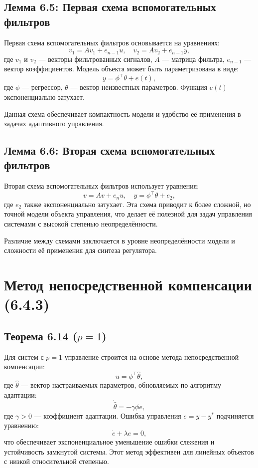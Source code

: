 \documentclass[a4paper,14pt]{extarticle} %
\begin{document}
\subsection{Лемма 6.5: Первая схема вспомогательных фильтров}
Первая схема вспомогательных фильтров основывается на уравнениях:
\[
v_1 = A v_1 + e_{n-1} u, \quad v_2 = A v_2 + e_{n-1} y,
\]
где \( v_1 \) и \( v_2 \) — векторы фильтрованных сигналов, \( A \) — матрица фильтра, \( e_{n-1} \) — вектор коэффициентов. Модель объекта может быть параметризована в виде:
\[
y = \phi^\top \theta + e(t),
\]
где \( \phi \) — регрессор, \( \theta \) — вектор неизвестных параметров. Функция \( e(t) \) экспоненциально затухает.

Данная схема обеспечивает компактность модели и удобство её применения в задачах адаптивного управления.

\subsection{Лемма 6.6: Вторая схема вспомогательных фильтров}
Вторая схема вспомогательных фильтров использует уравнения:
\[
v = A v + e_n u, \quad y = \phi^\top \theta + e_2,
\]
где \( e_2 \) также экспоненциально затухает. Эта схема приводит к более сложной, но точной модели объекта управления, что делает её полезной для задач управления системами с высокой степенью неопределённости.

Различие между схемами заключается в уровне неопределённости модели и сложности её применения для синтеза регулятора.

\section{Метод непосредственной компенсации (6.4.3)}

\subsection{Теорема 6.14 (\( p = 1 \))}
Для систем с \( p = 1 \) управление строится на основе метода непосредственной компенсации:
\[
u = \phi^\top \hat{\theta},
\]
где \( \hat{\theta} \) — вектор настраиваемых параметров, обновляемых по алгоритму адаптации:
\[
\dot{\hat{\theta}} = -\gamma \phi e,
\]
где \( \gamma > 0 \) — коэффициент адаптации. Ошибка управления \( e = y - y^* \) подчиняется уравнению:
\[
\dot{e} + \lambda e = 0,
\]
что обеспечивает экспоненциальное уменьшение ошибки слежения и устойчивость замкнутой системы. Этот метод эффективен для линейных объектов с низкой относительной степенью.
\end{document}
